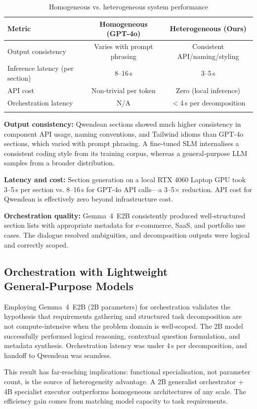 \documentclass[pdflatex,sn-mathphys-num]{sn-jnl}
\theoremstyle{thmstyleone}
\theoremstyle{thmstyletwo}
\theoremstyle{thmstylethree}
\begin{document}
\begin{table}[htbp]
\centering
\caption{Homogeneous vs. heterogeneous system performance}
\label{tab:comparison}
\begin{tabular}{@{}lcc@{}}
\toprule
Metric & Homogeneous (GPT-4o) & Heterogeneous (Ours) \\
\midrule
Output consistency & Varies with prompt phrasing & Consistent API/naming/styling \\
Inference latency (per section) & 8–16 s & 3–5 s \\
API cost & Non‑trivial per token & Zero (local inference) \\
Orchestration latency & N/A & $<$4 s per decomposition \\
\botrule
\end{tabular}
\end{table}

\textbf{Output consistency:} Qwendean sections showed much higher consistency in component API usage, naming conventions, and Tailwind idioms than GPT-4o sections, which varied with prompt phrasing. A fine‑tuned SLM internalises a consistent coding style from its training corpus, whereas a general‑purpose LLM samples from a broader distribution.

\textbf{Latency and cost:} Section generation on a local RTX 4060 Laptop GPU took 3–5 s per section vs. 8–16 s for GPT-4o API calls—a 3–5× reduction. API cost for Qwendean is effectively zero beyond infrastructure cost.

\textbf{Orchestration quality:} Gemma~4~E2B consistently produced well‑structured section lists with appropriate metadata for e‑commerce, SaaS, and portfolio use cases. The dialogue resolved ambiguities, and decomposition outputs were logical and correctly scoped.

\subsection{Orchestration with Lightweight General‑Purpose Models}
Employing Gemma~4~E2B (2B parameters) for orchestration validates the hypothesis that requirements gathering and structured task decomposition are not compute‑intensive when the problem domain is well‑scoped. The 2B model successfully performed logical reasoning, contextual question formulation, and metadata synthesis. Orchestration latency was under 4 s per decomposition, and handoff to Qwendean was seamless.

This result has far‑reaching implications: functional specialisation, not parameter count, is the source of heterogeneity advantage. A 2B generalist orchestrator + 4B specialist executor outperforms homogeneous architectures of any scale. The efficiency gain comes from matching model capacity to task requirements.
\end{document}
